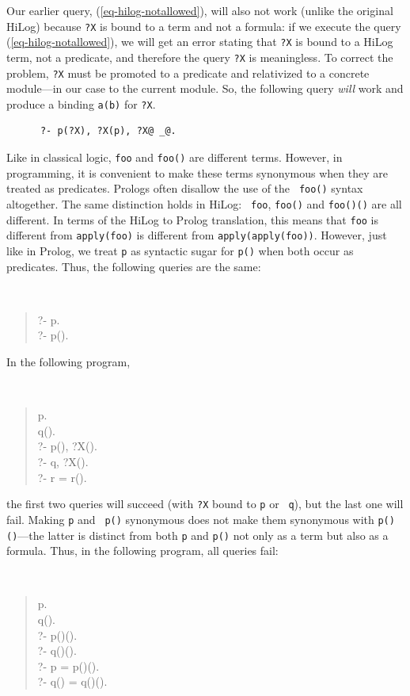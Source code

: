 \documentclass[11pt]{article}
\begin{document}
Our earlier query,
(\ref{eq-hilog-notallowed}), will also not work (unlike the original HiLog)
because {\tt ?X} is bound to a term and not a formula: if we
execute the query (\ref{eq-hilog-notallowed}), we will get an error stating
that {\tt ?X} is bound to a HiLog term, not a predicate, and therefore the
query {\tt ?X} is meaningless.
To correct the problem, {\tt ?X} must be promoted to a predicate
and relativized to a concrete
module---in our case to the current module. So, the following query
\emph{will} work and produce a binding {\tt a(b)} for {\tt ?X}.    
\begin{verbatim}
      ?- p(?X), ?X(p), ?X@ _@.
\end{verbatim}


%
Like in classical logic, {\tt foo} and {\tt foo()} are different terms.
However, in programming, it is convenient to make these terms synonymous
when they
are treated as predicates. Prologs often disallow the use of the {\tt
  foo()} syntax altogether.  The same distinction holds in HiLog: {\tt
  foo}, {\tt foo()} and {\tt foo()()} are all different. In terms of the
HiLog to Prolog translation, this means that {\tt foo} is different from
{\tt apply(foo)} is different from {\tt apply(apply(foo))}.  However, just
like in Prolog, we treat {\tt p} as syntactic sugar for {\tt p()} when both
occur as predicates. Thus, the following queries are the same:
{\tt
\begin{quote}
  ?- p.\\
  ?- p().
\end{quote}
}
\noindent
In the following program,
{\tt
\begin{quote}
 p. \\
 q().\\
 ?- p(), ?X().\\
 ?- q, ?X().\\
 ?- r = r().
\end{quote}
}
\noindent
the first two queries will succeed (with {\tt ?X} bound to {\tt p} or {\tt
  q}), but the last one will fail.  Making {\tt p} and {\tt
  p()} synonymous does not make them synonymous with {\tt p()()}---the
latter is distinct from both {\tt p}
and {\tt p()} not only as a term but also as a formula. Thus, in the following
program, all queries fail:
{\tt
\begin{quote}
 p.\\
 q().\\
 ?- p()().\\
 ?- q()().\\
 ?- p = p()().\\
 ?- q() = q()().
\end{quote}
}
\end{document}
